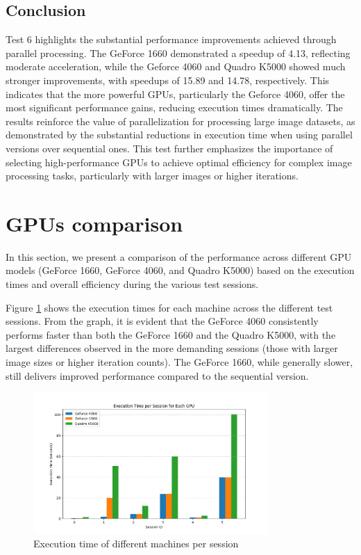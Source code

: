 \subsection{Conclusion}
Test 6 highlights the substantial performance improvements achieved through parallel processing. The GeForce 1660 demonstrated a speedup of 4.13, reflecting moderate acceleration, while the Geforce 4060 and Quadro K5000 showed much stronger improvements, with speedups of 15.89 and 14.78, respectively. This indicates that the more powerful GPUs, particularly the Geforce 4060, offer the most significant performance gains, reducing execution times dramatically.
The results reinforce the value of parallelization for processing large image datasets, as demonstrated by the substantial reductions in execution time when using parallel versions over sequential ones. This test further emphasizes the importance of selecting high-performance GPUs to achieve optimal efficiency for complex image processing tasks, particularly with larger images or higher iterations.        

\newpage
\section{GPUs comparison}
In this section, we present a comparison of the performance across different GPU models (GeForce 1660, GeForce 4060, and Quadro K5000) based on the execution times and overall efficiency during the various test sessions.

Figure \ref{figure:execution_time_per_session} shows the execution times for each machine across the different test sessions. From the graph, it is evident that the GeForce 4060 consistently performs faster than both the GeForce 1660 and the Quadro K5000, with the largest differences observed in the more demanding sessions (those with larger image sizes or higher iteration counts). The GeForce 1660, while generally slower, still delivers improved performance compared to the sequential version.

\begin{figure}[H]
    \centering
    \includegraphics[width=0.8\textwidth]{images/execution_time_per_session.jpeg}
    \caption{Execution time of different machines per session}
    \label{figure:execution_time_per_session}
\end{figure}

